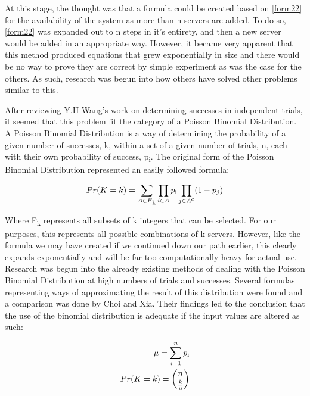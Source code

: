 \documentclass[thesis,proposal]{umassthesis}  %
\begin{document}
At this stage, the thought was that a formula could be created based on \eqref{form22} for the availability of the system as more than n servers are added. To do so, \eqref{form22} was expanded out to n steps in it's entirety, and then a new server would be added in an appropriate way. However, it became very apparent  that this method produced equations that grew exponentially in size and there would be no way to prove they are correct by simple experiment as was the case for the others.  As such, research was begun into how others have solved other problems similar to this. \par

After reviewing Y.H Wang's work on determining successes in independent trials, it seemed that this problem fit the category of a Poisson Binomial Distribution\cite{PoissonBinomialExact}. A Poisson Binomial Distribution is a way of determining the probability of a given number of successes, k, within a set of a given number of trials, n, each with their own probability of success, p\textsubscript{i}. The original form of the Poisson Binomial Distribution represented an easily followed formula:


\begin{equation}\label{poisBinomForm}
Pr(K=k) = \sum_{A \in F\textsubscript{k}}\prod_{i \in A}p\textsubscript{i}\prod_{j \in A\textsuperscript{c}}(1-p_{j})
\end{equation}

Where F\textsubscript{k} represents all subsets of k integers that can be selected. For our purposes, this represents all possible combinations of k servers. However, like the formula we may have created if we continued down our path earlier, this clearly expands exponentially and will be far too computationally heavy for actual use. Research was begun into the already existing methods of dealing with the Poisson Binomial Distribution at high numbers of trials and successes. Several formulas representing ways of approximating the result of this distribution were found and a comparison was done by Choi and Xia\cite{PoissonApprox}. Their findings led to the conclusion that the use of the binomial distribution is adequate if the input values are altered as such:

\begin{subequations}\label{approx}
\begin{align}
\mu = \sum\limits_{i=1}^{n}p\textsubscript{i}\label{muFormula}\\
Pr(K=k) = {n \choose \frac{k}{\mu}}\label{approxFormula}
\end{align}
\end{subequations}
\end{document}
